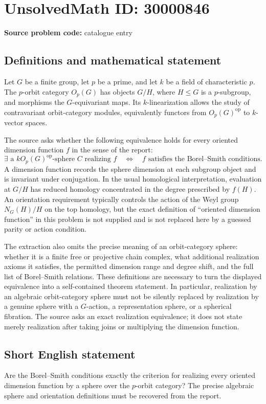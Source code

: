 \documentclass[11pt]{article}
\begin{document}
\section*{UnsolvedMath ID: 30000846}
\textbf{Source problem code:} catalogue entry
\subsection{Definitions and mathematical statement}
Let \(G\) be a finite group, let \(p\) be a prime, and let \(k\) be a field of characteristic \(p\). The \(p\)-orbit category \(O_p(G)\) has objects \(G/H\), where \(H\leq G\) is a \(p\)-subgroup, and morphisms the \(G\)-equivariant maps. Its \(k\)-linearization allows the study of contravariant orbit-category modules, equivalently functors from \(O_p(G)^{\mathrm{op}}\) to \(k\)-vector spaces.

The source asks whether the following equivalence holds for every oriented dimension function \(f\) in the sense of the report:
\[
\exists\text{ a }kO_p(G)^{\mathrm{op}}\text{-sphere }C
\text{ realizing }f
\quad\Longleftrightarrow\quad
f\text{ satisfies the Borel--Smith conditions}.
\]
A dimension function records the sphere dimension at each subgroup object and is invariant under conjugation. In the usual homological interpretation, evaluation at \(G/H\) has reduced homology concentrated in the degree prescribed by \(f(H)\). An orientation requirement typically controls the action of the Weyl group \(N_G(H)/H\) on the top homology, but the exact definition of ``oriented dimension function'' in this problem is not supplied and is not replaced here by a guessed parity or action condition.

The extraction also omits the precise meaning of an orbit-category sphere: whether it is a finite free or projective chain complex, what additional realization axioms it satisfies, the permitted dimension range and degree shift, and the full list of Borel--Smith relations. These definitions are necessary to turn the displayed equivalence into a self-contained theorem statement. In particular, realization by an algebraic orbit-category sphere must not be silently replaced by realization by a genuine sphere with a \(G\)-action, a representation sphere, or a spherical fibration. The source asks an exact realization equivalence; it does not state merely realization after taking joins or multiplying the dimension function.
\subsection{Short English statement}
Are the Borel--Smith conditions exactly the criterion for realizing every oriented dimension function by a sphere over the \(p\)-orbit category? The precise algebraic sphere and orientation definitions must be recovered from the report.
\end{document}
